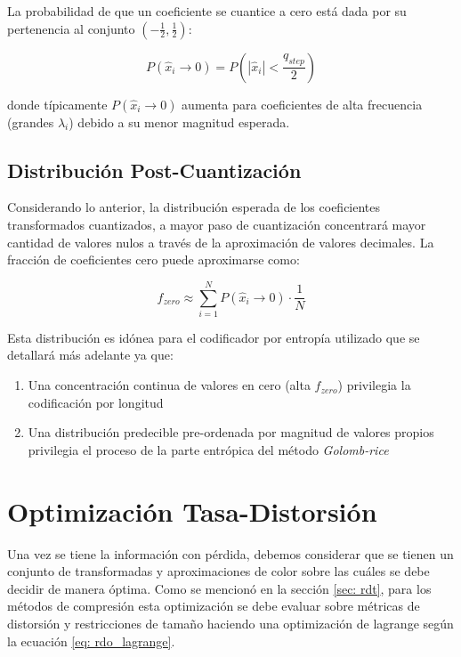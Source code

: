     La probabilidad de que un coeficiente se cuantice a cero está dada por su pertenencia al conjunto $\left(-\frac{1}{2},\frac{1}{2}\right)$:
    
    $$P(\hat{x}_i \to 0) = P\left(|\hat{x}_i| < \frac{q_{step}}{2}\right)$$
    
    donde típicamente $P(\hat{x}_i \to 0)$ aumenta para coeficientes de alta frecuencia (grandes $\lambda_i$) debido a su menor magnitud esperada.
    
    \subsection{Distribución Post-Cuantización}
    
    Considerando lo anterior, la distribución esperada de los coeficientes transformados cuantizados, a mayor paso de cuantización concentrará mayor cantidad de valores nulos a través de la aproximación de valores decimales. La fracción de coeficientes cero puede aproximarse como:
    
    $$f_{zero} \approx \sum_{i=1}^{N} P(\hat{x}_i \to 0) \cdot \frac{1}{N}$$
    
    Esta distribución es idónea para el codificador por entropía utilizado que se detallará más adelante ya que:
    
    \begin{enumerate}
        \item Una concentración continua de valores en cero (alta $f_{zero}$) privilegia la codificación por longitud
        \item Una distribución predecible pre-ordenada por magnitud de valores propios privilegia el proceso de la parte entrópica del método \textit{Golomb-rice}
    \end{enumerate}


\section{Optimización Tasa-Distorsión}\label{sec:rdo_method}
    Una vez se tiene la información con pérdida, debemos considerar que se tienen un conjunto de transformadas y aproximaciones de color sobre las cuáles se debe decidir de manera óptima. Como se mencionó en la sección \ref{sec: rdt}, para los métodos de compresión esta optimización se debe evaluar sobre métricas de distorsión y restricciones de tamaño haciendo una optimización de lagrange según la ecuación \ref{eq: rdo_lagrange}.\\

